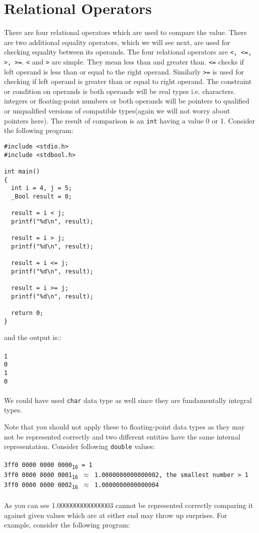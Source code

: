 \section{Relational Operators}
There are four relational operators which are used to compare the value. There 
are two additional equality operators, which we will see next, are used for 
checking equality between its operands. The four relational operators are 
\texttt{<, <=, >, >=}. \texttt{<} and \texttt{>} are simple. They mean less 
than and greater than. \texttt{<=} checks if left operand is less than or equal 
to the right operand. Similarly \texttt{>=} is used for checking if left 
operand is greater than or equal to right operand. The constraint or condition 
on operands is both operands will be real types i.e. characters. integers or 
floating-point numbers or both operands will be pointers to qualified or 
unqualified versions of compatible types(again we will not worry about pointers 
here). The result of comparison is an \texttt{int} having a value 0 or 1. 
Consider the following program:

\begin{Verbatim}[frame=single]
#include <stdio.h>
#include <stdbool.h>

int main()
{
  int i = 4, j = 5;
  _Bool result = 0;

  result = i < j;
  printf("%d\n", result);

  result = i > j;
  printf("%d\n", result);

  result = i <= j;
  printf("%d\n", result);

  result = i >= j;
  printf("%d\n", result);

  return 0;
}
\end{Verbatim}

and the output is::
\\\\\texttt{1\\
0\\
1\\
0\\\\}
We could have used \texttt{char} data type as well since they are fundamentally 
integral types.


Note that you should not apply these to floating-point data types as they may
not be represented correctly and two different entities have the same internal
representation. Consider following \texttt{double} values:
\\\\\texttt{3ff0 0000 0000 0000\textsubscript{16}   = 1\\
3ff0 0000 0000 0001\textsubscript{16}   $\approx$ 1.0000000000000002, 
the smallest 
number > 1\\
3ff0 0000 0000 0002\textsubscript{16} $\approx$ 1.0000000000000004\\\\}
As you can see 1.0000000000000003 cannot be represented correctly comparing it 
against given values which are at either end may throw up surprises. For 
example, consider the following program:

